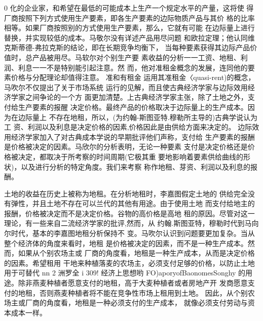 0
化的企业家，和希望在最低的可能成本上生产一个规定水平的产量，这将使
得厂商按照下列方式使用生产要素，即各生产要素的边际物质产品与其价
格的比率相等。如果厂商按照别的方式使用生产要素，那么，它就有可能
在边际量上进行替换，并实现较低的成本。马敬尔没有详述产品用尽问题
和欧拉定理；他认同维克斯蒂德-弗拉克斯的结论，即在长期竞争均衡下，
当每种要素获得其边际产品价值时，总产品被用尽。马软尔对个别生产要
素收益的分析一一工资、地租、利润、利息一一不是特别能引起注意。然
而，他对准租金概念的发展，连同他的要素价格与分配理论却值得注意。
准和有租金
运用其准租金〈quasi-rent)的概念，马吹尔不仅提出了关于市场系统
运行的见解，而且使古典经济学家与边际效用经济学家之间争论的一个方
面更加清楚。上古典经济学家主张，除了土地之外，支付给生产要素的报醒
决定价格。最终产品的价格取决于边际量上的生产成本。因为在边际量上
不存在地租，所以，(为约翰-斯图亚特.穆勒所主导的)古典学说认为工
资、利润以及利息是决定价格的因素,价格因此是由供给方面来决定的。
边际效用经济学家加入了对古典成本学说的早期批评他们声称，支付给
生产要素的报酬是价格被决定的因素。马欣尔的分析表明，无论一种要素
支付是决定价格还是价格被决定，都取决于所考察的时间周期(它极其重
要地影响着要素供给曲线的形状)，以及进行分析的特定角度。我们来考察
称作地租、芽资、利润以及利息的报酬。

土地的收益在历史上被称为地租。在分析地租时，李嘉图假定土地的
供给完全没有弹性，并且土地不存在可以兰代的其他有用途。由于使用土地
而支付给地主的报酬，价格被决定而不是决定价格。谷物的高价格是高地
租的原因。尽管对这一理论，有一些来自二流经济学家的批评,然而，从
约翰.斯图亚特，穆勒时代到马向尔时代，基本的李嘉图地租分析保持不
变。马吹尔认识到问题要更加复杂。当从整个经济体的角度来看时，地租
是价格被决定的因素，而不是一种生产成本。然而，如果从个别农场主或
厂商的角度看，地租是一种生产成本，从而是决定价格的因素。希望租用
干地来种植落麦的农场主，必须支付足够的价格，以防止土地用于可替代
nn
2
洲罗全
i
309!
经济上思想哟
FO)aporyofBaonomesSonghy
的用途。除非燕麦种植者愿意支付的地租，高于大麦种植者或者房地产开
发商愿意支付的地租，否则燕麦种植者将不能在竞争性市场上租用到土地。
因此，从个别农场主或厂商的角度看，地租是一种必须支付的生产成本，
就像必须支付劳动与资本成本一样。

